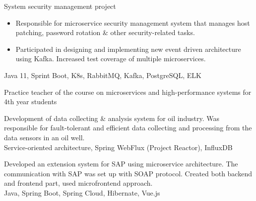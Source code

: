 \documentclass[10pt,a4paper,ragged2e,withhyper]{altacv}
\begin{document}
\begin{paracol}{2}


System security management project
\begin{itemize}
\item Responsible for microservice security management system that manages host patching, password rotation \& other security-related tasks.
\item Participated in designing and implementing new event driven architecture using Kafka. Increased test coverage of multiple microservices.
\end{itemize}
Java 11, Sprint Boot, K8s, RabbitMQ, Kafka, PostgreSQL, ELK

\divider


Practice teacher of the course on microservices and high-performance systems for 4th year students


\divider


Development of data collecting & analysis system for oil industry. Was responsible for fault-tolerant and efficient data collecting and processing from the data sensors in an oil well.\\
Service-oriented architecture, Spring WebFlux (Project Reactor), InfluxDB

\divider


Developed an extension system for SAP using microservice architecture. The communication with SAP was set up with SOAP protocol. Created both backend and frontend part, used microfrontend approach.\\
Java, Spring Boot, Spring Cloud, Hibernate, Vue.js

\switchcolumn


\end{paracol}
\end{document}
